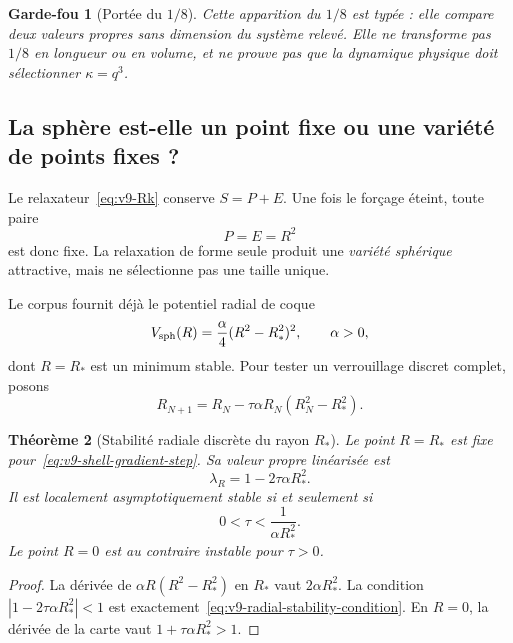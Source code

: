 \documentclass[11pt,a4paper]{article}
\newtheorem{theorem}{Théorème}[section]
\newtheorem{guardrail}[theorem]{Garde-fou}
\begin{document}
\begin{guardrail}[Portée du $1/8$]
Cette apparition du $1/8$ est typée : elle compare deux valeurs propres sans dimension du système relevé. Elle ne transforme pas $1/8$ en longueur ou en volume, et ne prouve pas que la dynamique physique doit sélectionner $\kappa=q^3$.
\end{guardrail}

\subsection{La sphère est-elle un point fixe ou une variété de points fixes ?}

Le relaxateur~\eqref{eq:v9-Rk} conserve $S=P+E$. Une fois le forçage éteint, toute paire
\[
 P=E=R^2
\]
est donc fixe. La relaxation de forme seule produit une \emph{variété sphérique} attractive, mais ne sélectionne pas une taille unique.

Le corpus fournit déjà le potentiel radial de coque
\begin{equation}\label{eq:v9-shell-potential}
 V_{\rm sph}(R)=\frac{\alpha}{4}(R^2-R_*^2)^2,
 \qquad \alpha>0,
\end{equation}
dont $R=R_*$ est un minimum stable. Pour tester un verrouillage discret complet, posons
\begin{equation}\label{eq:v9-shell-gradient-step}
 R_{N+1}=R_N-\tau\alpha R_N(R_N^2-R_*^2).
\end{equation}

\begin{theorem}[Stabilité radiale discrète du rayon $R_*$]\label{thm:v9-radial-stability}
Le point $R=R_*$ est fixe pour~\eqref{eq:v9-shell-gradient-step}. Sa valeur propre linéarisée est
\begin{equation}\label{eq:v9-radial-eig}
 \lambda_R=1-2\tau\alpha R_*^2.
\end{equation}
Il est localement asymptotiquement stable si et seulement si
\begin{equation}\label{eq:v9-radial-stability-condition}
 \boxed{0<\tau<\frac{1}{\alpha R_*^2}.}
\end{equation}
Le point $R=0$ est au contraire instable pour $\tau>0$.
\end{theorem}

\begin{proof}
La dérivée de $\alpha R(R^2-R_*^2)$ en $R_*$ vaut $2\alpha R_*^2$. La condition $|1-2\tau\alpha R_*^2|<1$ est exactement~\eqref{eq:v9-radial-stability-condition}. En $R=0$, la dérivée de la carte vaut $1+\tau\alpha R_*^2>1$.
\end{proof}
\end{document}

